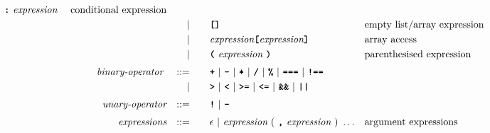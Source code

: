 \begin{alignat*}{9}
                                            \ \textbf{\texttt{:}}\
                                            \textit{expression}\
                                                           && \textrm{conditional expression}\\
&&                       && |   &\quad &&   \textbf{\texttt{[]}}
                                                           && \textrm{empty list/array expression}\\
&&                       && |   &\quad && \textit{expression} \textbf{\texttt{[}}
                                          \textit{expression} \textbf{\texttt{]}}
                                                           && \textrm{array access} \\
&&                       && |   &\quad &&  \textbf{\texttt{(}}\  \textit{expression} \ 
                                            \textbf{\texttt{)}} && \textrm{parenthesised expression}\\[1mm]
&& \textit{binary-operator}    \ 
                        && ::= &\quad && \textbf{\texttt{+}}\ |\ \textbf{\texttt{-}}\ |\ \textbf{\texttt{*}}\ |\ \textbf{\texttt{/}}\ |\ \textbf{\texttt{\%}}\ |\ 
                                   \textbf{\texttt{===}}\ |\ \textbf{\texttt{!==}}\ \\
&&                       && |  &\quad &&  \texttt{\textbf{>}}\ |\ \texttt{\textbf{<}}\ |\ \texttt{\textbf{>=}}\ |\ \texttt{\textbf{<=}}\
                                          |\ \textbf{\texttt{\&\&}}\ |\ \texttt{\textbf{||}}\  \\[1mm]
&& \textit{unary-operator}    
                        && ::= &\quad && \textbf{\texttt{!}}\ |\ \textbf{\texttt{-}}\\[1mm]
&& \textit{expressions}  && ::= &\quad && \epsilon\ | \ \textit{expression}\ (
                                                               \ \textbf{\texttt{,}} \
                                                                 \textit{expression} \ 
                                                                      )\ \ldots
                                                            && \textrm{argument expressions}
\end{alignat*}






















    

